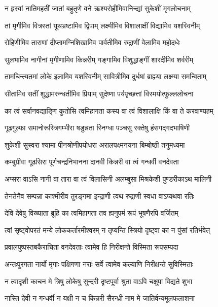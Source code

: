 \twolineshloka
{न ह्रस्वां नातिमहतीं जातां बहुतृणे वने}
{ऋश्यरोहीमिवानिन्द्यां सुकेशीं मृगलोचनाम्}


\twolineshloka
{तां मृगीमिव वित्रस्तां यूथभ्रष्टामिव द्विपाम्}
{लक्ष्मीमिव विशालाक्षीं विद्यामिव यशस्विनीम्}


\twolineshloka
{रोहिणीमिव ताराणां दीप्तामग्निशिखामिव}
{पार्वतीमिव रुद्राणीं वेलामिव महोदधेः}


\twolineshloka
{सुलभामिव नागीनां मृगीणामिव किन्नरीम्}
{गङ्गामिव विशुद्धाङ्गीं शारदीमिव शर्वरीम्}


\twolineshloka
{तामचिन्त्यतमां लोके इलामिव यशस्विनीम्}
{सावित्रीमिव दुर्धषां ब्राह्म्या लक्ष्म्या समन्विताम्}


\twolineshloka
{सीतामिव सतीं शुद्धामरुन्धतीमिव प्रियाम्}
{सुदेष्णा पर्यपृच्छत्तां विस्मयोत्फुल्ललोचना}


\twolineshloka
{का त्वं सर्वानवद्याङ्गि कुतोसि त्वमिहागता}
{कस्य वा त्वं विशालाक्षि किं वा ते करवाण्यहम्}


\twolineshloka
{गूढगुल्फा समानोरूस्त्रिगम्भीरा षडुन्नता}
{स्निग्धा पञ्चसु रक्तेषु हंसगद्गदभाषिणी}


\twolineshloka
{शुकेशी सुस्वरा श्यामा पीनश्रोणीपयोधरा}
{अरालपक्ष्मनयना बिम्बोष्ठी तनुमध्यमा}


\twolineshloka
{कम्बुग्रीवा गूढसिरा पूर्णचन्द्रनिभानना}
{दानवी किन्नरी वा त्वं गन्धर्वी वनदेवता}


\twolineshloka
{अप्सरा वाऽसि नागी वा तारा वा त्वं विलासिनी}
{अलम्बुसा मिश्रकेशी पुण्डरीकाऽथ मालिनी}


\twolineshloka
{तेनतेनैव सम्पन्ना काश्मीरीव तुरङ्गमा}
{इन्द्राणी त्वथ रुद्राणी स्वधा वाऽप्यथवा रतिः}


\twolineshloka
{देवि देवेषु विख्याता ब्रूहि का त्वमिहागता}
{तव ह्यनुपमं रूपं भूषणैरपि वर्जितम्}


\twolineshloka
{त्वां सृष्ट्वोपरतं मन्ये लोककर्तारमीश्वरम्}
{न तृप्यन्ति स्त्रियो दृष्ट्वा का न पुंसां रतिर्भवेत्}


\twolineshloka
{प्रवालपुष्पस्तबकैराचिता वनदेवताः}
{त्वामेव हि निरीक्षन्ते विस्मिता रूपसम्पदा}


\twolineshloka
{अन्तःपुरगता नार्यो मृगाः पक्षिगणा नराः}
{सर्वे त्वामेव कल्याणि निरीक्षन्ते सुविस्मिताः}


\twolineshloka
{न त्वादृशी काचन मे त्रिषु लोकेषु सुन्दरी}
{दृष्टपूर्वा श्रुता वाऽपि चक्षुपा विद्यते शुभा}




\twolineshloka
{नास्ति देवी न गन्धर्वी न यक्षी न च किन्नरी}
{सैरन्ध्री नाम मे जातिर्वन्यमूलफलाशना}


